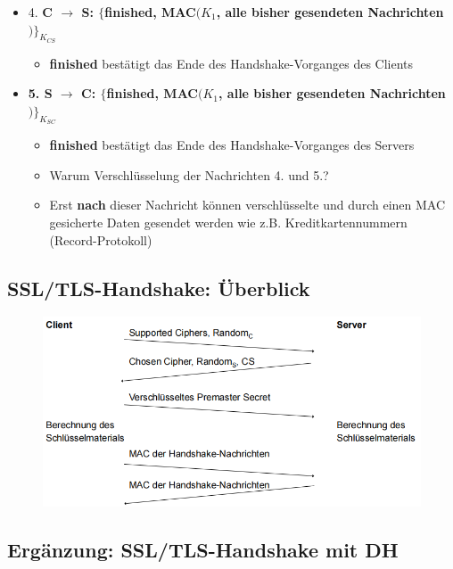 \documentclass[openany]{book}
\begin{document}
\begin{itemize}
    \item 4. \textbf{C $\rightarrow$ S: $\{$finished, MAC$(K_1$, alle bisher gesendeten Nachrichten$)\}_{K_{CS}}$}
    \begin{itemize}
        \item \textbf{finished} bestätigt das Ende des Handshake-Vorganges des Clients  
    \end{itemize}
    \item \textbf{5. S $\rightarrow$ C: $\{$finished, MAC$(K_1$, alle bisher gesendeten Nachrichten$)\}_{K_{SC}}$}
    \begin{itemize}
        \item \textbf{finished} bestätigt das Ende des Handshake-Vorganges des Servers
        \item Warum Verschlüsselung der Nachrichten 4. und 5.?
        \item Erst \textbf{nach} dieser Nachricht können verschlüsselte und durch einen MAC gesicherte Daten gesendet werden wie z.B. Kreditkartennummern (Record-Protokoll) 
    \end{itemize}
\end{itemize}

\subsection{SSL/TLS-Handshake: Überblick}

\begin{figure}[h!]
    \centering
    \includegraphics[width=\linewidth]{Pics/SSLHandshake.PNG}
\end{figure}

\subsection{Ergänzung: SSL/TLS-Handshake mit DH}
\end{document}
